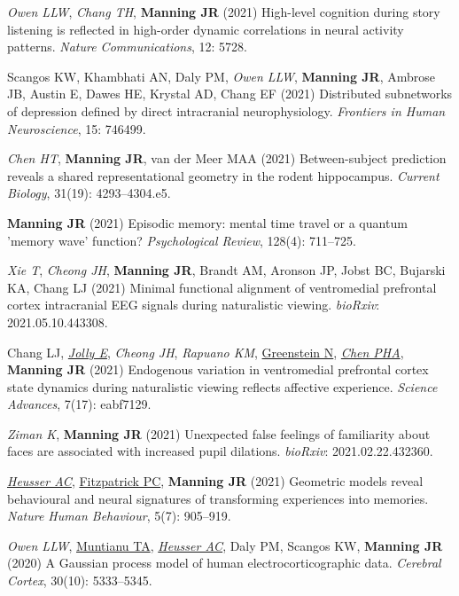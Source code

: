 \documentclass[11pt, a4paper]{article} %
\begin{document}
\begin{etaremune}
\item \textit{Owen LLW}, \textit{Chang TH}, \textbf{Manning JR} (2021) High-level cognition during story listening is reflected in high-order dynamic correlations in neural activity patterns. \textit{Nature Communications}, 12: 5728.

\item Scangos KW, Khambhati AN, Daly PM, \textit{Owen LLW}, \textbf{Manning JR}, Ambrose JB, Austin E, Dawes HE, Krystal AD, Chang EF (2021) Distributed subnetworks of depression defined by direct intracranial neurophysiology. \textit{Frontiers in Human Neuroscience}, 15: 746499.

\item \textit{Chen HT}, \textbf{Manning JR}, van der Meer MAA (2021) Between-subject prediction reveals a shared representational geometry in the rodent hippocampus. \textit{Current Biology}, 31(19): 4293--4304.e5.

\item \textbf{Manning JR} (2021) Episodic memory: mental time travel or a quantum 'memory wave' function? \textit{Psychological Review}, 128(4): 711--725.

\item \textit{Xie T}, \textit{Cheong JH}, \textbf{Manning JR}, Brandt AM, Aronson JP, Jobst BC, Bujarski KA, Chang LJ (2021) Minimal functional alignment of ventromedial prefrontal cortex intracranial EEG signals during naturalistic viewing. \textit{bioRxiv}: 2021.05.10.443308.

\item Chang LJ, \ul{\textit{Jolly E}}, \textit{Cheong JH}, \textit{Rapuano KM}, \ul{Greenstein N}, \ul{\textit{Chen PHA}}, \textbf{Manning JR} (2021) Endogenous variation in ventromedial prefrontal cortex state dynamics during naturalistic viewing reflects affective experience. \textit{Science Advances}, 7(17): eabf7129.

\item \textit{Ziman K}, \textbf{Manning JR} (2021) Unexpected false feelings of familiarity about faces are associated with increased pupil dilations. \textit{bioRxiv}: 2021.02.22.432360.

\item \ul{\textit{Heusser AC}}, \ul{Fitzpatrick PC}, \textbf{Manning JR} (2021) Geometric models reveal behavioural and neural signatures of transforming experiences into memories. \textit{Nature Human Behaviour}, 5(7): 905--919.

\item \textit{Owen LLW}, \ul{Muntianu TA}, \ul{\textit{Heusser AC}}, Daly PM, Scangos KW, \textbf{Manning JR} (2020) A Gaussian process model of human electrocorticographic data. \textit{Cerebral Cortex}, 30(10): 5333--5345.


\end{etaremune}
\end{document}
